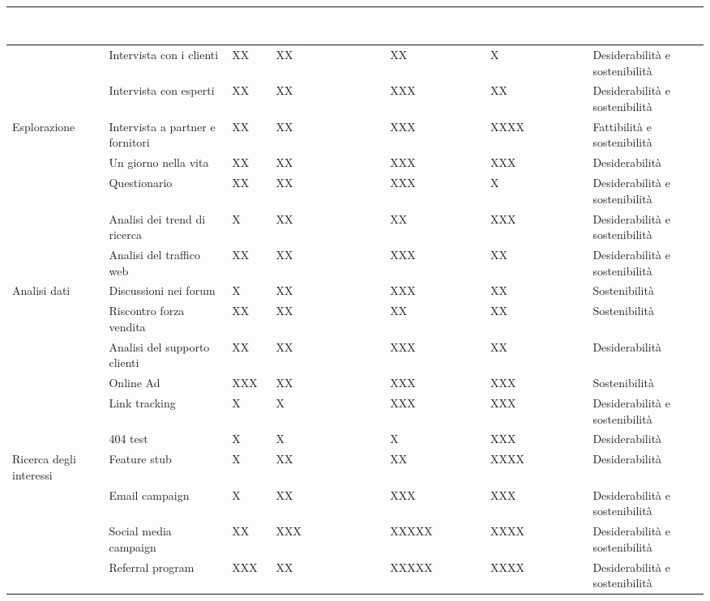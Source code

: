 \begin{table}[ht]
\centering
{}
\footnotesize
\begin{tabular}{|p{2cm}|p{2cm}|p{2cm}|p{2cm}|p{2cm}|p{2cm}|p{2cm}|}
\hline
\rowcolor{headerblue}
\textbf{\textcolor{white}{Tipo}} & \textbf{\textcolor{white}{Esperimento}} & \textbf{\textcolor{white}{Costo}} & \textbf{\textcolor{white}{Tempo di
preparazione}} & \textbf{\textcolor{white}{Tempo di
esecuzione}} & \textbf{\textcolor{white}{Forza dell’evidenza}} & \textbf{\textcolor{white}{Rischi}}\\\hline

& Intervista con i clienti & XX & XX & XX & X & Desiderabilità e sostenibilità\\
& Intervista con esperti & XX & XX & XXX & XX & Desiderabilità e sostenibilità\\
Esplorazione & Intervista a partner e fornitori & XX & XX & XXX & XXXX & Fattibilità e sostenibilità\\
& Un giorno nella vita & XX & XX & XXX & XXX & Desiderabilità\\
& Questionario & XX & XX & XXX & X & Desiderabilità e sostenibilità\\\hline

& Analisi dei trend di ricerca & X & XX & XX & XXX & Desiderabilità e sostenibilità\\
& Analisi del traffico web & XX & XX & XXX & XX & Desiderabilità e sostenibilità\\
Analisi dati & Discussioni nei forum & X & XX & XXX & XX & Sostenibilità\\
& Riscontro forza vendita & XX & XX & XX & XX & Sostenibilità\\
& Analisi del supporto clienti & XX & XX & XXX & XX & Desiderabilità\\\hline

& Online Ad & XXX & XX & XXX & XXX & Sostenibilità\\
& Link tracking & X & X & XXX & XXX & Desiderabilità e sostenibilità\\
& 404 test & X & X & X & XXX & Desiderabilità\\
Ricerca degli interessi & Feature stub & X & XX & XX & XXXX & Desiderabilità\\
& Email campaign & X & XX & XXX & XXX & Desiderabilità e sostenibilità\\
& Social media campaign & XX & XXX & XXXXX & XXXX & Desiderabilità e sostenibilità\\
& Referral program & XXX & XX & XXXXX & XXXX & Desiderabilità e sostenibilità\\\hline


\end{tabular}
\end{table}
